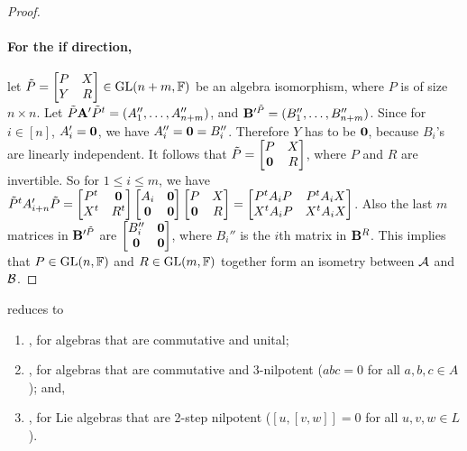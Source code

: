 \documentclass[11pt]{article}
\begin{document}
\begin{proof}
\paragraph{For the if direction,} let $\tilde P=\begin{bmatrix}
P & X \\
Y & R
\end{bmatrix}\in\mathrm{GL}(n+m, \mathbb{F})$ be an algebra isomorphism, where $P$ is of size 
$n\times n$. Let 
$\tilde P\mathbf{A}' \tilde P^t=(A_1'', 
\dots, A_{n+m}'')$, and $\mathbf{B}'^{\tilde P}=(B_1'',\dots, B_{n+m}'')$. Since for $i\in[n]$, 
$A_i'=\mathbf{0}$, we have $A_i''=\mathbf{0}=B_i''$. Therefore $Y$ has to be $\mathbf{0}$, 
because 
$B_i$'s 
are linearly independent. It follows that $\tilde P=
\begin{bmatrix}
P & X \\
\mathbf{0} & R
\end{bmatrix}$, where $P$ and $R$ are invertible.
So for $1\leq i\leq 
m$, we have $\tilde P^t A_{i+n}' \tilde P=\begin{bmatrix}
P^t & \mathbf{0} \\
X^t & R^t
\end{bmatrix}\begin{bmatrix}
A_i & \mathbf{0} \\
\mathbf{0} & \mathbf{0} 
\end{bmatrix} 
\begin{bmatrix}
P & X \\
\mathbf{0} & R
\end{bmatrix}
=
\begin{bmatrix}
P^t A_i P& P^t A_i X\\
X^t A_i P & X^t A_i X
\end{bmatrix}
$. Also the last $m$ matrices in $\mathbf{B}'^{\tilde P}$ are $\begin{bmatrix} B_i'' & \mathbf{0} 
\\\mathbf{0} & \mathbf{0} \end{bmatrix}$, where $B_i''$ is the $i$th matrix in $\mathbf{B}^R$.
This implies that $P\in\mathrm{GL}(n, 
\mathbb{F})$ and $R\in \mathrm{GL}(m, \mathbb{F})$ 
together form an isometry between $\mathcal{A}$ and $\mathcal{B}$.
\end{proof}


\begin{corollary} \label{cor:pseudo_special}
\MatSpIsomlong reduces to
\begin{enumerate}
\item \label{cor:pseudo_special:assoc_comm_unital} , for algebras that are commutative and unital; 

\item {}, for algebras that are commutative and 3-nilpotent ($abc=0$ for all $a,b,c \in A$); and, 

\item {}, for Lie algebras that are 2-step nilpotent ($[u,[v,w]]=0$ for all $u,v,w \in L$).
\end{enumerate}
\end{corollary}
\end{document}
